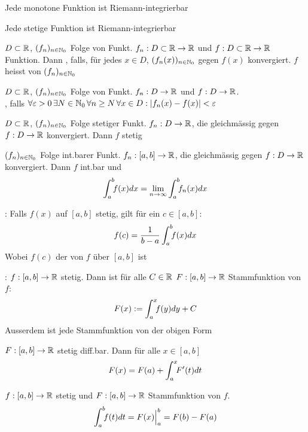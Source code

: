 \Satz Jede monotone Funktion ist Riemann-integrierbar

\Satz Jede stetige Funktion ist Riemann-integrierbar

\Def $D \subset \mathbb{R}$, $(f_n)_{n \in \mathbb{N}_0}$ Folge von Funkt. $f_n: D \subset \mathbb{R} \to \mathbb{R}$
und $f: D \subset \mathbb{R} \to \mathbb{R}$ Funktion.
Dann , falls, für jedes $x \in D$,
$(f_n(x))_{n\in\mathbb{N}_0}$ gegen $f(x)$ konvergiert. $f$ heisst 
von $(f_n)_{n\in\mathbb{N}_0}$

\Def $D \subset \mathbb{R}$, $(f_n)_{n\in\mathbb{N}_0}$ Folge von Funkt. $f_n: D \to \mathbb{R}$ und
$f: D \to \mathbb{R}$. \\
, falls
$\forall \varepsilon > 0 \, \exists N \in \mathbb{N}_0 \, \forall n \ge N \, \forall x \in D : |f_n(x) - f(x)| < \varepsilon$

\Satz $D \subset \mathbb{R}$, $(f_n)_{n \in \mathbb{N}_0}$ Folge stetiger Funkt. $f_n: D \to \mathbb{R}$, die gleichmässig
gegen $f: D \to \mathbb{R}$ konvergiert. Dann $f$ stetig

\Satz $(f_n)_{n \in \mathbb{N}_0}$ Folge int.barer Funkt. $f_n: [a, b] \to \mathbb{R}$, die gleichmässig
gegen $f: D \to \mathbb{R}$ konvergiert. Dann $f$ int.bar und
$$\displaystyle \int_a^b \hspace{-4pt}f(x)dx = \lim_{n\to\infty}\int_a^b \hspace{-4pt}f_n(x)dx$$

\Satz {}: Falls $f(x)$ auf $[a, b]$ stetig, gilt für ein
$c \in [a, b]$:
\vspace{-10pt}
$$f(c) = \frac{1}{b-a}\int_a^b \hspace{-4pt}f(x)dx$$
Wobei $f(c)$ der  von $f$ über $[a, b]$ ist

\Satz {}: $f: [a, b] \to \mathbb{R}$ stetig.
Dann ist für alle $C \in \mathbb{R}$ $F: [a, b] \to \mathbb{R}$ Stammfunktion von $f$:
$$F(x) := \int_{a}^{x} \hspace{-4pt} f(y) dy + C$$
Ausserdem ist jede Stammfunktion von der obigen Form

\Kor $F: [a, b] \to \mathbb{R}$ stetig diff.bar. Dann für alle $x \in [a, b]$
$$F(x) = F(a) + \int_{a}^{x} \hspace{-4pt}F'(t) dt$$

\Kor $f: [a, b] \to \mathbb{R}$ stetig und $F: [a, b] \to \mathbb{R}$ Stammfunktion von $f$.
$$\int_a^b \hspace{-4pt} f(t) dt = F(x)\Big|_a^b = F(b) - F(a)$$

